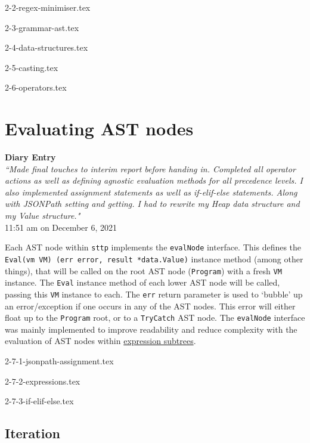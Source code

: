 \documentclass[]{full}
\theoremstyle{definition}
\begin{document}
{2-2-regex-minimiser.tex}

{2-3-grammar-ast.tex}

{2-4-data-structures.tex}

{2-5-casting.tex}

{2-6-operators.tex}

\section{Evaluating AST nodes}

\begin{center}
    \textbf{Diary Entry}\\[0.5em]
    \textit{``Made final touches to interim report before handing in. Completed all operator actions as well as defining agnostic evaluation methods for all precedence levels. I also implemented assignment statements as well as if-elif-else statements. Along with JSONPath setting and getting. I had to rewrite my Heap data structure and my Value structure."}\\[0.5em]
    \tiny{11:51 am on December 6, 2021}
\end{center}

Each AST node within \verb|sttp| implements the \verb|evalNode| interface. This defines the \texttt{Eval(vm VM) (err error, result *data.Value)} instance method (among other things), that will be called on the root AST node (\verb|Program|) with a fresh \verb|VM| instance. The \verb|Eval| instance method of each lower AST node will be called, passing this \verb|VM| instance to each. The \verb|err| return parameter is used to `bubble' up an error/exception if one occurs in any of the AST nodes. This error will either float up to the \verb|Program| root, or to a \verb|TryCatch| AST node. The \verb|evalNode| interface was mainly implemented to improve readability and reduce complexity with the evaluation of AST nodes within \hyperref[sec:development-ast-nodes-expressions]{expression subtrees}.

{2-7-1-jsonpath-assignment.tex}

{2-7-2-expressions.tex}

{2-7-3-if-elif-else.tex}

\subsection{Iteration}
\end{document}
